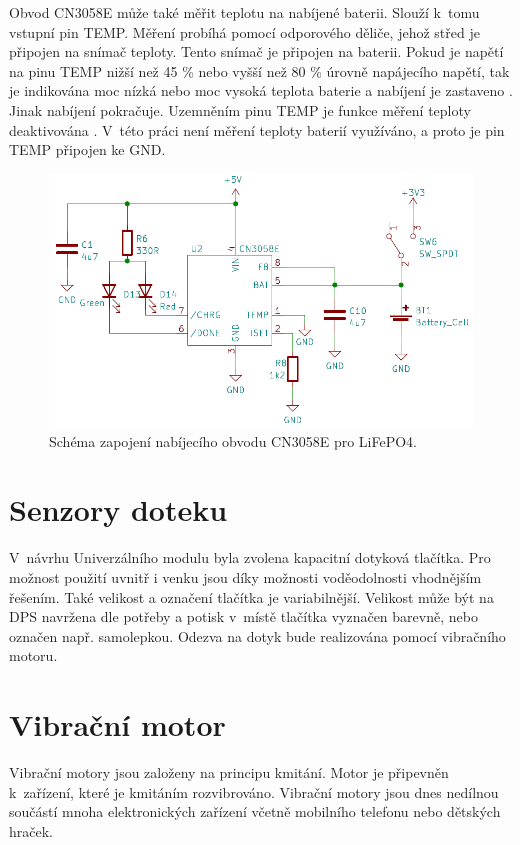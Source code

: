 Obvod CN3058E může také měřit teplotu na nabíjené baterii. Slouží k~tomu vstupní pin TEMP. Měření probíhá pomocí odporového děliče, jehož střed je připojen na snímač 
teploty. Tento snímač je připojen na baterii. Pokud je napětí na pinu TEMP nižší než 45 \% nebo vyšší než 80 \% úrovně napájecího napětí, tak je indikována moc nízká
nebo moc vysoká teplota baterie a nabíjení je zastaveno \cite{charger_dtsh}. Jinak nabíjení pokračuje. Uzemněním pinu TEMP je funkce měření teploty deaktivována 
\cite{charger_dtsh}. V~této práci není měření teploty baterií využíváno, a proto je pin TEMP připojen ke GND. 

\begin{figure}[!h]
  \begin{center}
    \includegraphics[scale=0.55]{obrazky/CN3058E.png}
  \end{center}
  \caption[Schéma zapojení nabíjecího obvodu CN3058E pro LiFePO4]{Schéma zapojení nabíjecího obvodu CN3058E pro LiFePO4.}
\end{figure}

\section{Senzory doteku}
V~návrhu Univerzálního modulu byla zvolena kapacitní dotyková tlačítka. Pro možnost použití uvnitř i venku jsou díky možnosti voděodolnosti 
vhodnějším řešením. Také velikost a označení tlačítka je variabilnější. Velikost může být na DPS navržena dle potřeby a potisk
v~místě tlačítka vyznačen barevně, nebo označen např. samolepkou. Odezva na dotyk bude realizována pomocí vibračního motoru.

\section{Vibrační motor}
Vibrační motory jsou založeny na principu kmitání. Motor je připevněn k~zařízení, které je kmitáním rozvibrováno. Vibrační motory jsou dnes 
nedílnou součástí mnoha elektronických zařízení včetně mobilního telefonu nebo dětských hraček. 

